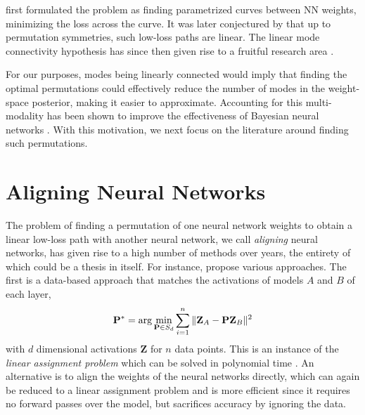 \citet{garipovLossSurfacesMode2018a} first formulated the problem as finding parametrized curves between NN weights, minimizing the loss across the curve. It was later conjectured by \citet{entezariRolePermutationInvariance2022} that up to permutation symmetries, such low-loss paths are linear. The linear mode connectivity hypothesis has since then given rise to a fruitful research area \citep{ferbachProvingLinearMode2024,rossiPermutationSymmetriesBayesian2023,zhaoUnderstandingModeConnectivity2023}. 

For our purposes, modes being linearly connected would imply that finding the optimal permutations could effectively reduce the number of modes in the weight-space posterior, making it easier to approximate. Accounting for this multi-modality has been shown to improve the effectiveness of Bayesian neural networks \citep{sommerConnectingDotsModeConnectedness2024}. With this motivation, we next focus on the literature around finding such permutations. 

\section{Aligning Neural Networks}

The problem of finding a permutation of one neural network weights to obtain a linear low-loss path with another neural network, we call \textit{aligning} neural networks, has given rise to a high number of methods over years, the entirety of which could be a thesis in itself. For instance, \citep{ainsworthGitReBasinMerging2023} propose various approaches. The first is a data-based approach that matches the activations of models $A$ and $B$ of each layer,
\begin{equation}
    \mathbf{P}^* = \arg\min_{\mathbf{P} \in S_d} \sum_{i=1}^n \Vert \mathbf{Z}_A - \mathbf{P} \mathbf{Z}_B \Vert ^2
\end{equation}
with $d$ dimensional activations $\mathbf{Z}$ for $n$ data points. This is an instance of the \textit{linear assignment problem} which can be solved in polynomial time \citep{crouseImplementing2DRectangular2016}. An alternative is to align the weights of the neural networks directly, which can again be reduced to a linear assignment problem and is more efficient since it requires no forward passes over the model, but sacrifices accuracy by ignoring the data. 

